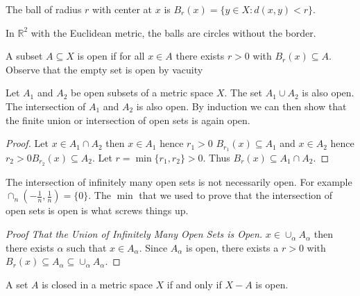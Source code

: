 \documentclass{article}
\newcommand{\R}{\mathbb{R}}
\begin{document}
\begin{definition}[Ball]
The ball of radius $r$ with center at $x$ is $B_r(x)=\{y\in X:d(x,y)<r\}$.
\end{definition}
\begin{definition}
In $\R^2$ with the Euclidean metric, the balls are circles without the border.
\end{definition}
\begin{definition}
A subset $A\subseteq X$ is open if for all $x\in A$ there exists $r>0$ with $B_r(x)\subseteq A$. Observe that the empty set is open by vacuity
\end{definition}
\begin{proposition}
Let $A_1$ and $A_2$ be open subsets of a metric space $X$. The set $A_1\cup A_2$ is also open. The intersection of $A_1$ and $A_2$ is also open. By induction we can then show that the finite union or intersection of open sets is again open.
\end{proposition}
\begin{proof}
Let $x\in A_1\cap A_2$ then $x\in A_1$ hence $r_1>0$ $B_{r_1}(x)\subseteq A_1$ and $x\in A_2$ hence $r_2>0 B_{r_2}(x)\subseteq A_2$. Let $r=\min\{r_1,r_2\}>0$. Thus $B_r(x)\subseteq A_1\cap A_2$.
\end{proof}
\begin{example}
The intersection of infinitely many open sets is not necessarily open. For example $\cap_n(-\frac{1}{n},\frac{1}{n})=\{0\}$. The $\min$ that we used to prove that the intersection of open sets is open is what screws things up.
\end{example}
\begin{proof}[Proof That the Union of Infinitely Many Open Sets is Open]
$x\in \cup_\alpha A_\alpha$ then there exists $\alpha$ such that $x\in A_\alpha$. Since $A_\alpha$ is open, there exists a $r>0$ with $B_r(x)\subseteq A_\alpha\subseteq \cup_\alpha A_\alpha$.
\end{proof}
\begin{definition}
A set $A$ is closed in a metric space $X$ if and only if $X-A$ is open.
\end{definition}
\end{document}
